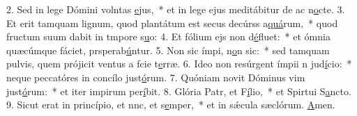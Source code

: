 2. Sed in lege Dómini volntas \uline{e}jus,~* et in lege ejus meditábitur de ac n\uline{o}cte.
3. Et erit tamquam lignum, quod plantátum est secus decúrss a\uline{quá}rum,~* quod fructum suum dabit in tmpore s\uline{u}o:
4. Et fólium ejs non d\uline{é}fluet:~* et ómnia quæcúmque fáciet, prsperab\uline{ú}ntur.
5. Non sic ímpi, n\uline{o}n sic:~* sed tamquam pulvis, quem prójicit ventus a fcie t\uline{e}rræ.
6. Ideo non resúrgent ímpii n jud\uline{í}cio:~* neque peccatóres in concílo just\uline{ó}rum.
7. Quóniam novit Dóminus vim just\uline{ó}rum:~* et iter impirum per\uline{í}bit.
8. Glória Patr, et F\uline{í}lio,~* et Spirtui S\uline{a}ncto.
9. Sicut erat in princípio, et nnc, et s\uline{e}mper,~* et in sǽcula sæclórum. \uline{A}men.
